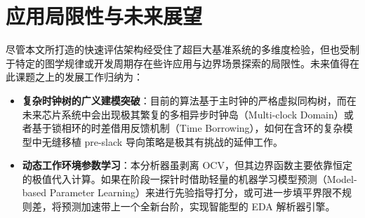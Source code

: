 \section{应用局限性与未来展望}
\label{sec:future_work}

尽管本文所打造的快速评估架构经受住了超巨大基准系统的多维度检验，但也受制于特定的图学规律或开发周期存在些许应用与边界场景探索的局限性。未来值得在此课题之上的发展工作归纳为：
\begin{itemize}
    \item \textbf{复杂时钟树的广义建模突破}：目前的算法基于主时钟的严格虚拟同构树，而在未来芯片系统中会出现极其繁复的多相异步时钟岛（Multi-clock Domain）或者基于锁相环的时差借用反馈机制（Time Borrowing），如何在含环的复杂模型中无缝移植 pre-slack 导向策略是极其有挑战的延伸工作。
    \item \textbf{动态工作环境参数学习}：本分析器虽剥离 OCV，但其边界函数主要依靠恒定的极值代入计算。如果在阶段一探针时借助轻量的机器学习模型预测（Model-based Parameter Learning）来进行先验指导打分，或可进一步填平界限不规则差，将预测加速带上一个全新台阶，实现智能型的 EDA 解析器引擎。
\end{itemize}

